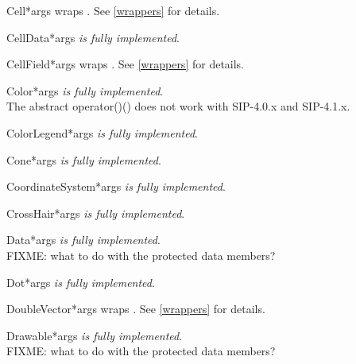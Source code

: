\documentclass{manual}
\begin{document}
\begin{classdesc}{Cell}{*args}
wraps . See \ref{wrappers} for details.
\end{classdesc}

\begin{classdesc}{CellData}{*args}
\emph{is fully implemented}.
\end{classdesc}

\begin{classdesc}{CellField}{*args}
wraps . See \ref{wrappers} for details.
\end{classdesc}

\begin{classdesc}{Color}{*args}
\emph{is fully implemented}.\\
The abstract operator()() does not work with SIP-4.0.x and SIP-4.1.x.
\end{classdesc}

\begin{classdesc}{ColorLegend}{*args}
\emph{is fully implemented}.
\end{classdesc}

\begin{classdesc}{Cone}{*args}
\emph{is fully implemented}.
\end{classdesc}

\begin{classdesc}{CoordinateSystem}{*args}
\emph{is fully implemented}.
\end{classdesc}

\begin{classdesc}{CrossHair}{*args}
\emph{is fully implemented}.
\end{classdesc}

\begin{classdesc}{Data}{*args}
\emph{is fully implemented}.\\
FIXME: what to do with the protected data members?
\end{classdesc}

\begin{classdesc}{Dot}{*args}
\emph{is fully implemented}.
\end{classdesc}

\begin{classdesc}{DoubleVector}{*args}
wraps . See \ref{wrappers} for details.
\end{classdesc}

\begin{classdesc}{Drawable}{*args}
\emph{is fully implemented}.\\
FIXME: what to do with the protected data members?
\end{classdesc}
\end{document}
